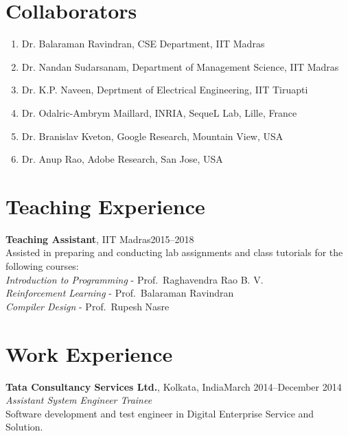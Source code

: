 \documentclass[margin,11pt]{res}
\begin{document}
\begin{resume}
\section{Collaborators}
\begin{enumerate}
\item Dr. Balaraman Ravindran, CSE Department, IIT Madras
\item Dr. Nandan Sudarsanam, Department of Management Science, IIT Madras
\item Dr. K.P. Naveen, Deprtment of Electrical Engineering, IIT Tiruapti
\item Dr. Odalric-Ambrym Maillard, INRIA, SequeL Lab, Lille, France
\item Dr. Branislav Kveton, Google Research, Mountain View, USA
\item Dr. Anup Rao, Adobe Research, San Jose, USA
\end{enumerate}

\section{Teaching Experience}
\par
\textbf{Teaching Assistant}, IIT Madras\hfill 2015--2018\\
Assisted in preparing and conducting lab assignments and class tutorials for the following courses:\\
\textit{Introduction to Programming} - Prof.~Raghavendra Rao B. V. \\
\textit{Reinforcement Learning} - Prof.~Balaraman Ravindran\\
\textit{Compiler Design} - Prof.~Rupesh Nasre

\section{Work Experience}
\textbf{Tata Consultancy Services Ltd.}, Kolkata, India\hfill March 2014--December 2014\\
\textit{Assistant System Engineer Trainee}\\
Software development and test engineer in Digital Enterprise Service and Solution.



\end{resume}
\end{document}
